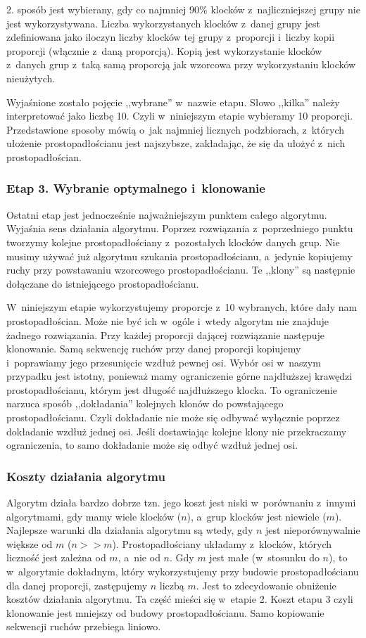 \documentclass[12pt]{article}
\begin{document}
2. sposób jest wybierany, gdy co najmniej
$90\%$ klocków z~najliczniejszej grupy nie jest wykorzystywana.
Liczba wykorzystanych klocków z~danej grupy jest zdefiniowana jako iloczyn
liczby klocków tej grupy z~proporcji i~liczby kopii proporcji (włącznie
z~daną proporcją). Kopią jest wykorzystanie klocków z~danych grup z~taką
samą proporcją jak wzorcowa przy wykorzystaniu klocków nieużytych. 

Wyjaśnione zostało pojęcie ,,wybrane'' w~nazwie etapu. Słowo ,,kilka''
należy interpretować jako liczbę 10. Czyli w~niniejszym etapie wybieramy
10 proporcji. Przedstawione sposoby mówią o~jak najmniej licznych
podzbiorach, z~których ułożenie prostopadłościanu jest najszybsze,
zakładając, że się da ułożyć z~nich prostopadłościan.

\subsubsection{Etap 3. Wybranie optymalnego i~klonowanie}
Ostatni etap jest jednocześnie najważniejszym punktem całego algorytmu.
Wyjaśnia sens działania algorytmu. Poprzez rozwiązania z~poprzedniego
punktu tworzymy kolejne prostopadłościany z~pozostałych klocków danych
grup. Nie musimy używać już algorytmu szukania prostopadłościanu, a~jedynie
kopiujemy ruchy przy powstawaniu wzorcowego prostopadłościanu. Te ,,klony''
są następnie dołączane do istniejącego prostopadłościanu.

W~niniejszym etapie wykorzystujemy proporcje z~10 wybranych, które dały
nam prostopadłościan. Może nie być ich w~ogóle i~wtedy algorytm nie
znajduje żadnego rozwiązania. Przy każdej proporcji dającej rozwiązanie
następuje klonowanie. Samą sekwencję ruchów przy danej proporcji kopiujemy
i~poprawiamy jego przesunięcie wzdłuż pewnej osi. Wybór osi w~naszym
przypadku jest istotny, ponieważ mamy ograniczenie górne najdłuższej
krawędzi prostopadłościanu, którym jest długość
najdłuższego klocka. To ograniczenie narzuca sposób ,,dokładania''
kolejnych klonów do powstającego prostopadłościanu. Czyli dokładanie nie
może się odbywać wyłącznie poprzez dokładanie wzdłuż jednej osi. Jeśli
dostawiając kolejne klony nie przekraczamy ograniczenia, to samo dokładanie
może się odbyć wzdłuż jednej osi.

\subsubsection{Koszty działania algorytmu}
Algorytm działa bardzo dobrze tzn. jego koszt jest niski w~porównaniu
z~innymi algorytmami, gdy mamy wiele klocków ($n$), a~grup klocków
jest niewiele ($m$). Najlepsze warunki dla działania algorytmu są wtedy,
gdy $n$ jest nieporównywalnie większe od $m$ ($n>>m$). Prostopadłościany
układamy z~klocków, których liczność jest zależna od $m$, a~nie od $n$.
Gdy $m$ jest małe (w~stosunku do $n$), to w~algorytmie dokładnym, który
wykorzystujemy przy budowie prostopadłościanu dla danej proporcji,
zastępujemy $n$ liczbą $m$. Jest to zdecydowanie obniżenie kosztów
działania algorytmu. Ta część mieści się w~etapie 2. Koszt etapu 3 czyli
klonowanie jest mniejszy od budowy prostopadłościanu. Samo kopiowanie
sekwencji ruchów przebiega liniowo.
\end{document}

